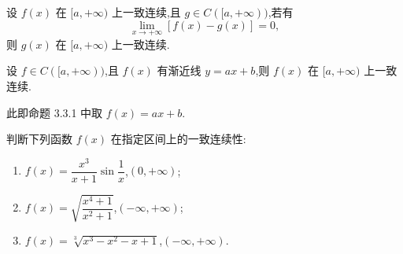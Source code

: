 \begin{proposition}[\markstar]
    设 $f(x)$ 在 $\lbrack a,+\infty)$ 上一致连续,且 $g\in C(\lbrack a,+\infty))$,若有
    \[
        \displaystyle\lim\limits_{x\to+\infty}[f(x)-g(x)]=0,
    \]
    则 $g(x)$ 在 $\lbrack a,+\infty)$ 上一致连续.
\end{proposition}

\begin{corollary}[\markstar]
    设 $f\in C(\lbrack a,+\infty))$,且 $f(x)$ 有渐近线 $y=ax+b$,则 $f(x)$ 在 $\lbrack a,+\infty)$ 上一致连续.
\end{corollary}

\begin{remark}
    此即命题 3.3.1 中取 $f(x)=ax+b$.
\end{remark}

\begin{example}
    判断下列函数 $f(x)$ 在指定区间上的一致连续性:
    \begin{enumerate}
        \item $f(x)=\dfrac{x^3}{x+1}\sin\dfrac{1}{x}$,$(0,+\infty)$;
        \item $f(x)=\sqrt{\dfrac{x^4+1}{x^2+1}}$,$(-\infty,+\infty)$;
        \item $f(x)=\sqrt[3]{x^3-x^2-x+1}$,$(-\infty,+\infty)$.
    \end{enumerate}
\end{example}
\exampleblank

